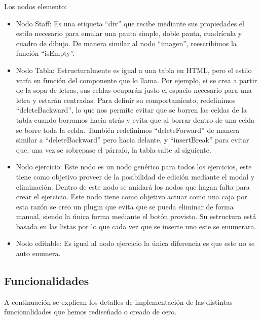 Los nodos elemento:
\begin{itemize}
  \item Nodo Staff: Es una etiqueta ``div'' que recibe mediante sus propiedades el estilo necesario para emular una pauta simple, doble pauta, cuadrícula y cuadro de dibujo. De manera similar al nodo ``imagen'', reescribimos la función ``isEmpty''.
  \item Nodo Tabla: Estructuralmente es igual a una tabla en HTML, pero el estilo varía en función del componente que lo llama. Por ejemplo, si se crea a partir de la sopa de letras, sus celdas ocuparán justo el espacio necesario para una letra y estarán centradas. Para definir su comportamiento, redefinimos ``deleteBackward'', lo que nos permite evitar que se borren las celdas de la tabla cuando borramos hacia atrás y evita que al borrar dentro de una celda se borre toda la celda. También redefinimos ``deleteForward'' de manera similar a ``deleteBackward'' pero hacia delante, y ``insertBreak'' para evitar que, una vez se sobrepase el párrafo, la tabla salte al siguiente.
  \item Nodo ejercicio: Este nodo es un nodo genérico para todos los ejercicios, este tiene como objetivo proveer de la posibilidad de edición mediante el modal y eliminación. Dentro de este nodo se anidará los nodos que hagan falta para crear el ejercicio. Este nodo tiene como objetivo actuar como una caja por esta razón se creo un plugin que evita que se pueda eliminar de forma manual, siendo la única forma mediante el botón provisto. Su estructura está basada
        en las listas por lo que cada vez que se inserte uno este se enumerara.
  \item Nodo editable: Es igual al nodo ejercicio la única diferencia es que este no se auto enumera.
\end{itemize}

\subsection{Funcionalidades}
A continuación se explican los detalles de implementación de las distintas funcionalidades que hemos rediseñado o creado de cero.

